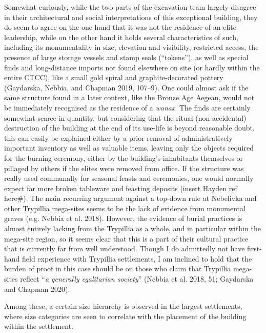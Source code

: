\documentclass[
  12pt,
  a4paper, twoside]{book}
\begin{document}
Somewhat curiously, while the two parts of the excavation team largely disagree in their architectural and social interpretations of this exceptional building, they do seem to agree on the one hand that it was not the residence of an elite leadership, while on the other hand it holds several characteristics of such, including its monumentality in size, elevation and visibility, restricted access, the presence of large storage vessels and stamp seals (``tokens''), as well as special finds and long-distance imports not found elsewhere on site (or hardly within the entire CTCC), like a small gold spiral and graphite-decorated pottery (Gaydarska, Nebbia, and Chapman 2019, 107--9). One could almost ask if the same structure found in a later context, like the Bronze Age Aegean, would not be immediately recognised as the residence of a \emph{wanax}. The finds are certainly somewhat scarce in quantity, but considering that the ritual (non-accidental) destruction of the building at the end of its use-life is beyond reasonable doubt, this can easily be explained either by a prior removal of administratively important inventory as well as valuable items, leaving only the objects required for the burning ceremony, either by the building's inhabitants themselves or pillaged by others if the elites were removed from office. If the structure was really used communally for seasonal feasts and ceremonies, one would normally expect far more broken tableware and feasting deposits (insert Hayden ref here\#). The main recurring argument against a top-down rule at Nebelivka and other Trypillia mega-sites seems to be the lack of evidence from monumental graves (e.g. Nebbia et al. 2018). However, the evidence of burial practices is almost entirely lacking from the Trypillia as a whole, and in particular within the mega-site region, so it seems clear that this is a part of their cultural practice that is currently far from well understood. Though I do admittedly not have first-hand field experience with Trypillia settlements, I am inclined to hold that the burden of proof in this case should be on those who claim that Trypillia mega-sites reflect ``\emph{a generally egalitarian society}'' (Nebbia et al. 2018, 51; Gaydarska and Chapman 2020).

Among these, a certain size hierarchy is observed in the largest settlements, where size categories are seen to correlate with the placement of the building within the settlement.
\end{document}
